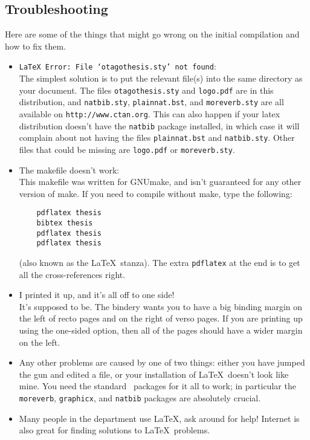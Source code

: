 \subsection{Troubleshooting}
\label{subsec:trouble}
Here are some of the things that might go wrong on the initial
compilation and how to fix them.
\begin{itemize}
\item {\tt LaTeX Error: File `otagothesis.sty' not found}: \\
The simplest solution is to put the relevant
file(s) into the same directory as your document.  The files
\verb|otagothesis.sty| and \verb|logo.pdf| are in this distribution,
and \verb|natbib.sty|, \verb|plainnat.bst|, and \verb|moreverb.sty|
are all available on \verb|http://www.ctan.org|.
This can also happen if your latex distribution doesn't have
the \verb|natbib| package installed, in which case it will complain
about not having the files \verb|plainnat.bst| and \verb|natbib.sty|.
Other files that could be missing are \verb|logo.pdf| or
\verb|moreverb.sty|.  

\item The makefile doesn't work: \\
This makefile was written for GNUmake, and isn't guaranteed for any
other version of make.  If you need to compile without make, type the
following:
\begin{verbatim}
    pdflatex thesis
    bibtex thesis
    pdflatex thesis
    pdflatex thesis
\end{verbatim}
(also known as the \LaTeX\ stanza).  The extra {\tt pdflatex} at the end
is to get all the cross-references right.

\item I printed it up, and it's all off to one side!\\
It's supposed to be.  The bindery wants you to have a big binding
margin on the left of recto pages and on the right of verso pages.
If you are printing up using the one-sided option, then all of the
pages should have a wider margin on the left.
\
\item Any other problems are caused by one of two things: either you
have jumped the gun and edited a file, or your installation of \LaTeX\
doesn't look like mine.  You need the standard \LaTeXe\ packages for
it all to work; in particular the {\tt moreverb}, {\tt graphicx}, and
{\tt natbib} packages are absolutely crucial.

\item Many people in the department use \LaTeX , ask around for help! Internet is also great for finding solutions to \LaTeX\ problems.

\end{itemize}

